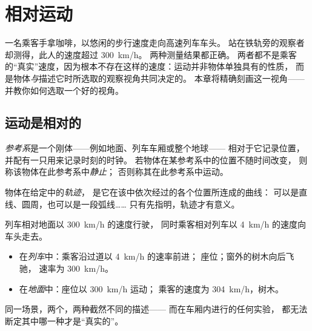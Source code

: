 \chapter{相对运动}\label{ch:g10:relative-motion}

一名乘客手拿咖啡，以悠闲的步行速度走向高速列车车头。
站在铁轨旁的观察者却测得，此人的速度超过 \qty{300}{km/h}。
两种测量结果都正确。
两者都不是乘客的“真实”速度，因为根本不存在这样的速度：运动并非物体单独具有的性质，
而是物体\emph{与}描述它时所选取的观察视角共同决定的。
本章将精确刻画这一视角——
并教你如何选取一个好的视角。

\section{运动是相对的}

\begin{definition}[参考系]\label{def:g10:relative-motion:frame}
\emph{参考系}是一个刚体——例如地面、列车车厢或整个地球——
相对于它记录位置，并配有一只用来记录时刻的时钟。
若物体在某参考系中的位置不随时间改变，
则称该物体在此参考系中\emph{静止}；
否则称其在此参考系中运动。
\end{definition}

\begin{definition}[轨迹]\label{def:g10:relative-motion:trajectory}
物体在给定中的\emph{轨迹}，
是它在该中依次经过的各个位置所连成的曲线：
可以是直线、圆周，也可以是一段弧线……
只有先指明，轨迹才有意义。
\end{definition}

\begin{example}[列车上的乘客]\label{ex:g10:relative-motion:walker}
列车相对地面以 \qty{300}{km/h} 的速度行驶，
同时乘客相对列车以 \qty{4}{km/h} 的速度向车头走去。
\begin{itemize}
  \item 在\emph{列车}中：乘客沿过道以 \qty{4}{km/h} 的速率前进；
        座位；窗外的树木向后飞驰，
        速率为 \qty{300}{km/h}。
  \item 在\emph{地面}中：座位以 \qty{300}{km/h} 运动；
        乘客的速度为 \qty{304}{km/h}，树木。
\end{itemize}
同一场景，两个，两种截然不同的描述——
而在车厢内进行的任何实验，
都无法断定其中哪一种才是“真实的”。
\end{example}

